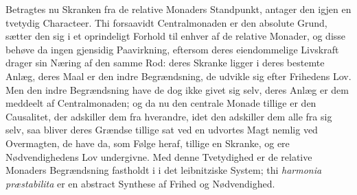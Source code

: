 \documentclass[12pt]{book}
\newcommand{\anm}[1]{\emph{\textbf{Anm.~#1.}}}
\newcommand{\opage}[1]{\marginnote{\footnotesize\textit{[#1]}}}
\begin{document}
Betragtes nu Skranken fra de relative Monaders Standpunkt, antager den igjen en
tvetydig Characteer. Thi forsaavidt Centralmonaden er den absolute Grund, sætter den
sig i et oprindeligt Forhold til enhver af de relative Monader, og disse behøve da
ingen gjensidig Paavirkning, eftersom deres eiendommelige Livskraft drager sin Næring
af den samme Rod: deres Skranke ligger i deres bestemte Anlæg, deres Maal er den indre
Begrændsning, de udvikle sig efter Frihedens Lov. Men den indre Begrændsning have de
dog ikke givet sig selv, deres Anlæg er dem meddeelt af Centralmonaden; og da nu den
centrale Monade tillige er den Causalitet, der adskiller dem fra hverandre, idet den
adskiller dem alle fra sig selv, saa bliver deres Grændse tillige sat ved en udvortes
Magt nemlig ved Overmagten, de have da, som Følge heraf, tillige en Skranke, og ere
Nødvendighedens Lov undergivne. Med denne Tvetydighed er de relative Monaders
Begrændsning fastholdt i i det leibnitziske System; thi
\textit{harmonia præstabilita} er en abstract Synthese af Frihed og Nødvendighed.
\opage{175} %
%
%
\end{document}
